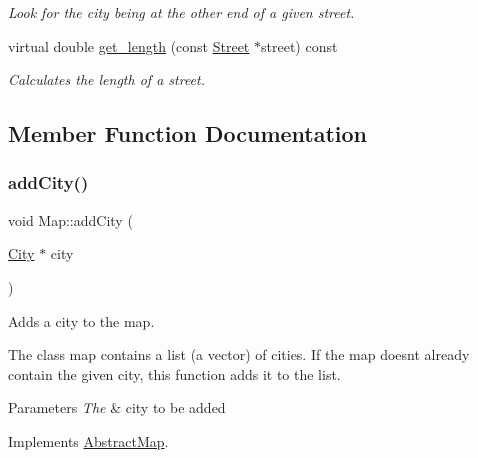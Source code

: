 \begin{DoxyCompactItemize}
\begin{DoxyCompactList}\small\item\em Look for the city being at the other end of a given street. \end{DoxyCompactList}\item 
virtual double \hyperlink{class_map_a041fd9e53a2e80a0fb3b1e11e3fdf1e9}{get\+\_\+length} (const \hyperlink{class_street}{Street} $\ast$street) const
\begin{DoxyCompactList}\small\item\em Calculates the length of a street. \end{DoxyCompactList}\end{DoxyCompactItemize}


\subsection{Member Function Documentation}
\mbox{\label{class_map_a3313ee9e1dc1bc7e8865ab2c64082ca8}} 
\subsubsection{\texorpdfstring{add\+City()}{addCity()}}
{\footnotesize\ttfamily void Map\+::add\+City (\begin{DoxyParamCaption}\item[{\hyperlink{class_city}{City} $\ast$}]{city }\end{DoxyParamCaption})\hspace{0.3cm}{\ttfamily [virtual]}}



Adds a city to the map. 

The class map contains a list (a vector) of cities. If the map doesn\textquotesingle{}t already contain the given city, this function adds it to the list.


\begin{DoxyParams}{Parameters}
{\em The} & city to be added \\
\hline
\end{DoxyParams}


Implements \hyperlink{class_abstract_map_a9938512c5ef94370786a3d1a72aa7e37}{Abstract\+Map}.

\mbox{\label{class_map_a9e5ad7aea193a11e3a5e2f0bb045e818}} 
